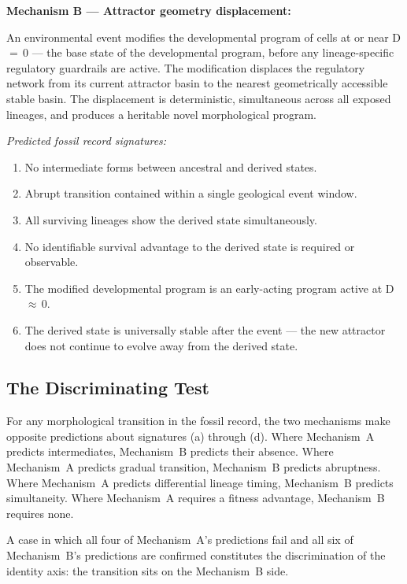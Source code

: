 \documentclass[11pt, a4paper]{article}
\begin{document}
\textbf{Mechanism B --- Attractor geometry
displacement:}

An environmental event modifies the developmental
program of cells at or near D\,$=$\,0 --- the base
state of the developmental program, before any
lineage-specific regulatory guardrails are active.
The modification displaces the regulatory network
from its current attractor basin to the nearest
geometrically accessible stable basin.
The displacement is deterministic, simultaneous
across all exposed lineages, and produces a heritable
novel morphological program.

\textit{Predicted fossil record signatures:}
\begin{enumerate}[leftmargin=*, label=(\alph*)]
\item No intermediate forms between ancestral
  and derived states.
\item Abrupt transition contained within a single
  geological event window.
\item All surviving lineages show the derived
  state simultaneously.
\item No identifiable survival advantage to
  the derived state is required or observable.
\item The modified developmental program is an
  early-acting program active at D\,$\approx$\,0.
\item The derived state is universally stable
  after the event --- the new attractor does not
  continue to evolve away from the derived state.
\end{enumerate}

\subsection{The Discriminating Test}

For any morphological transition in the fossil
record, the two mechanisms make opposite
predictions about signatures (a) through (d).
Where Mechanism~A predicts intermediates,
Mechanism~B predicts their absence.
Where Mechanism~A predicts gradual transition,
Mechanism~B predicts abruptness.
Where Mechanism~A predicts differential lineage
timing, Mechanism~B predicts simultaneity.
Where Mechanism~A requires a fitness advantage,
Mechanism~B requires none.

A case in which all four of Mechanism~A's
predictions fail and all six of Mechanism~B's
predictions are confirmed constitutes the
discrimination of the identity axis: the
transition sits on the Mechanism~B side.
\end{document}
